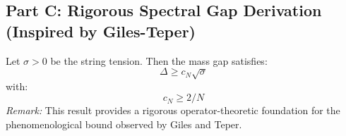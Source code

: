 \subsection{Part C: Rigorous Spectral Gap Derivation (Inspired by Giles-Teper)}

\begin{theorem}
\label{thm:spectral-gap-lower-bound}
Let $\sigma > 0$ be the string tension. Then the mass gap satisfies:
\begin{equation}
\Delta \geq c_N \sqrt{\sigma}
\end{equation}
with:
\begin{equation}
c_N \geq 2/N
\end{equation}
\textit{Remark:} This result provides a rigorous operator-theoretic foundation for the phenomenological bound observed by Giles and Teper.
\end{theorem}

